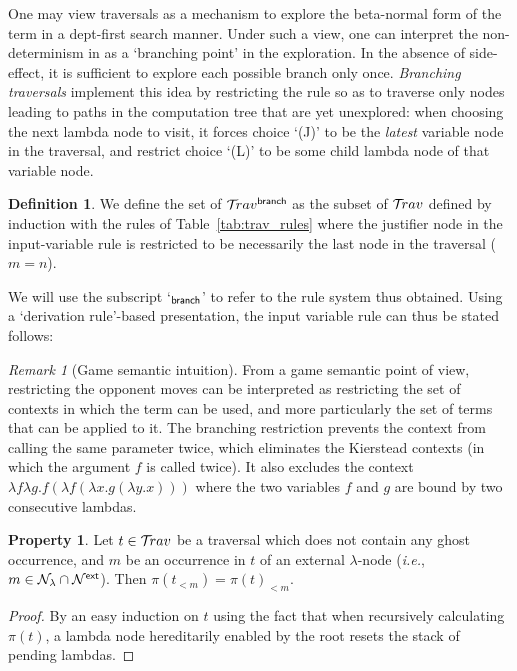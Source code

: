 \documentclass{article}
\makeatletter
\theoremstyle{plain}
\theoremstyle{definition}
\newtheorem{definition}{Definition}[section]
\newtheorem{property}{Property}[section]
\theoremstyle{remark}
\newtheorem{remark}{Remark}[section]
\newcommand\Nodes{\mathcal{N}}%
\newcommand\NodesVar{\Nodes_{\sf var}}%
\newcommand\NodesLmd{\Nodes_\lambda}%
\newcommand{\branching}{{\sf branch}}
\newcommand{\travsetbr}{{\travset^\branching}}
\newcommand{\travulc}{\travset}
\newcommand{\rulefont}[1]{\mathbf{\sf #1}}
\def\coresymbol{\pi} %
\newcommand{\core}[1]{\coresymbol(#1)} %
\newcommand{\enables}{\vdash} %
\newcommand{\ExtNodes}{\Nodes^{\sf ext}}
\renewcommand\ie{{\it i.e.\@\xspace}}
\makeatother
\begin{document}
One may view traversals as a mechanism to explore the beta-normal form of the term in a dept-first search manner. Under such a view, one can interpret the non-determinism in  as a `branching point' in the exploration. In the absence of side-effect, it is sufficient to explore each possible branch only once. \emph{Branching traversals} implement this idea by restricting the rule  so as to traverse only nodes leading to paths in the computation tree that are yet unexplored: when choosing the next lambda node to visit, it forces choice `(J)' to be the \emph{latest} variable node in the traversal, and restrict choice `(L)' to be some child lambda node of that variable node.

\begin{definition}
\label{dfn:branching_traversals}
We define the set of  $\travsetbr$ as the subset of $\travulc$ defined by induction with the rules of Table~\ref{tab:trav_rules} where the justifier node in the
input-variable rule  is restricted to be necessarily the last node in the traversal ($m=n$).

We will use the subscript `${}_\branching$' to refer to the rule system thus obtained. Using a `derivation rule'-based presentation, the input variable rule can thus be stated follows:
\infrule[$\rulefont{IVar_\branching}$]
     {t \cdot n \in\travsetbr
      \andalso n \in\ExtNodes\inter\NodesVar
      \andalso n \enables_i\alpha
      \andalso i \geq 1
     }
     { \in \travsetbr}
\end{definition}

\begin{remark}[Game semantic intuition]
From a game semantic point of view, restricting the opponent moves can be interpreted as restricting the set of contexts in which the term can be used, and more particularly the set of terms that can be applied to it.
The branching restriction prevents the context from calling the same parameter twice, which eliminates the Kierstead contexts (in which the argument $f$ is called twice). It also excludes the context $\lambda f \lambda g . f (\lambda f (\lambda x . g (\lambda y . x)))$ where the two variables $f$ and $g$ are bound by two consecutive lambdas.
\end{remark}

\begin{property}
\label{prop:core_truncation_at_externallambda}
Let $t\in\travulc$ be a traversal which does not contain any ghost occurrence, and $m$ be an occurrence in $t$ of an external $\lambda$-node (\ie, $m \in \NodesLmd\inter\ExtNodes$). Then $\core{t_{<m}} = \core{t}_{<m}$.
\end{property}
\begin{proof}
By an easy induction on $t$ using the fact that when recursively calculating $\coresymbol(t)$, a lambda node hereditarily enabled by the root resets the stack of pending lambdas.
\end{proof}
\end{document}
